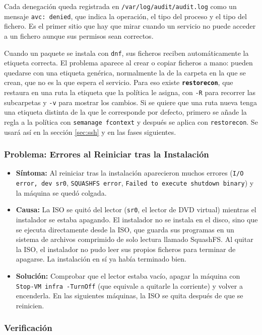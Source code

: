 \documentclass[11pt, a4paper, titlepage]{article}
\newcommand{\cod}[1]{\texttt{#1}}
\begin{document}
Cada denegación queda registrada en \cod{/var/log/audit/audit.log} como un mensaje \cod{avc: denied}, que indica la operación, el tipo del proceso y el tipo del fichero. Es el primer sitio que hay que mirar cuando un servicio no puede acceder a un fichero aunque sus permisos sean correctos.

Cuando un paquete se instala con \cod{dnf}, sus ficheros reciben automáticamente la etiqueta correcta. El problema aparece al crear o copiar ficheros a mano: pueden quedarse con una etiqueta genérica, normalmente la de la carpeta en la que se crean, que no es la que espera el servicio. Para eso existe \textbf{\cod{restorecon}}, que restaura en una ruta la etiqueta que la política le asigna, con \cod{-R} para recorrer las subcarpetas y \cod{-v} para mostrar los cambios. Si se quiere que una ruta nueva tenga una etiqueta distinta de la que le corresponde por defecto, primero se añade la regla a la política con \cod{semanage fcontext} y después se aplica con \cod{restorecon}. Se usará así en la sección \ref{sec:ssh} y en las fases siguientes.

\subsubsection{Problema: Errores al Reiniciar tras la Instalación}

\begin{itemize}
    \item \textbf{Síntoma:} Al reiniciar tras la instalación aparecieron muchos errores (\cod{I/O error, dev sr0}, \cod{SQUASHFS error}, \cod{Failed to execute shutdown binary}) y la máquina se quedó colgada.
    \item \textbf{Causa:} La ISO se quitó del lector (\cod{sr0}, el lector de DVD virtual) mientras el instalador se estaba apagando. El instalador no se instala en el disco, sino que se ejecuta directamente desde la ISO, que guarda sus programas en un sistema de archivos comprimido de solo lectura llamado SquashFS. Al quitar la ISO, el instalador no pudo leer sus propios ficheros para terminar de apagarse. La instalación en sí ya había terminado bien.
    \item \textbf{Solución:} Comprobar que el lector estaba vacío, apagar la máquina con \cod{Stop-VM infra -TurnOff} (que equivale a quitarle la corriente) y volver a encenderla. En las siguientes máquinas, la ISO se quita después de que se reinicien.
\end{itemize}

\subsubsection{Verificación}
\end{document}
